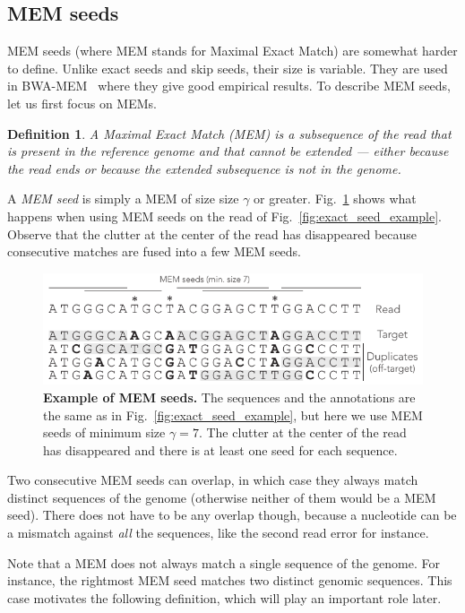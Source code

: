 \documentclass{article}
\newtheorem{definition}{Definition}
\begin{document}
\subsection{MEM seeds}

MEM seeds (where MEM stands for Maximal Exact Match) are somewhat harder
to define. Unlike exact seeds and skip seeds, their size is variable. They
are used in BWA-MEM~\cite{li2013aligning} where they give good empirical
results. To describe MEM seeds, let us first focus on MEMs.

\begin{definition}
A Maximal Exact Match (MEM) is a subsequence of the read that is present
in the reference genome and that cannot be extended --- either because the
read ends or because the extended subsequence is not in the genome.
\end{definition}

A \emph{MEM seed} is simply a MEM of size size $\gamma$ or greater.
Fig.~\ref{fig:MEM_example} shows what happens when using MEM seeds on the
read of Fig.~\ref{fig:exact_seed_example}. Observe that the clutter at the
center of the read has disappeared because consecutive matches are fused
into a few MEM seeds.

\begin{figure}[h]
\centering
\includegraphics[scale=1]{MEM_example.pdf}
\caption{\textbf{Example of MEM seeds.}
The sequences and the annotations are the same as in
Fig.~\ref{fig:exact_seed_example}, but here we use MEM seeds of minimum
size $\gamma=7$. The clutter at the center of the read has disappeared and
there is at least one seed for each sequence.}
\label{fig:MEM_example}
\end{figure}

Two consecutive MEM seeds can overlap, in which case they always match
distinct sequences of the genome (otherwise neither of them would be a MEM
seed). There does not have to be any overlap though, because a nucleotide
can be a mismatch against \emph{all} the sequences, like the second read
error for instance.

Note that a MEM does not always match a single sequence of the genome. For
instance, the rightmost MEM seed matches two distinct genomic sequences.
This case motivates the following definition, which will play an important
role later.
\end{document}
